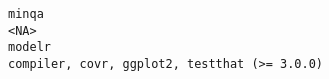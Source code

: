 \documentclass[
  letterpaper,
  DIV=11,
  numbers=noendperiod]{scrreprt}
\begin{document}
\begin{verbatim}
minqa                                                                                                                                                                                                                                                                                                                                                                                                                                                                                                                                                                                                                                                                                                                                                                                                                                                                                                                                                                                                                                                                                                                                                                                                                                                                                                    <NA>
modelr                                                                                                                                                                                                                                                                                                                                                                                                                                                                                                                                                                                                                                                                                                                                                                                                                                                                                                                                                                                                                                                                                                                                                                                                                                                           compiler, covr, ggplot2, testthat (>= 3.0.0)

\end{verbatim}
\end{document}
